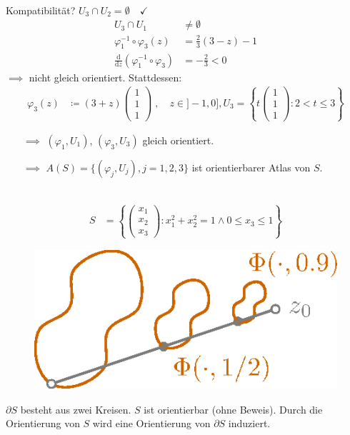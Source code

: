 \documentclass[a4paper,10pt]{scrbook}
\begin{document}
\begin{example}
\begin{enum-arab}
\begin{align*}
    \end{align*}
    Kompatibilität? $U_3 \cap U_2 = \emptyset \quad \checkmark$
    \begin{align*}
      U_3 \cap U_1 &\neq \emptyset \\
      \varphi_1^{-1} \circ \varphi_3(z) &= \frac{2}{3} (3-z) - 1 \\
      \frac{\mathrm{d}}{\mathrm{d}z} \left( \varphi_1^{-1} \circ \varphi_3 \right) &= -\frac{2}{3} < 0
    \end{align*}
    $\implies$ nicht gleich orientiert. Stattdessen:
    \begin{align*}
      \varphi_3(z) &\coloneq (3+z) \begin{pmatrix} 1 \\ 1 \\ 1 \end{pmatrix} \; , \quad z \in ]-1,0] , U_3 = \left\{ t \left(\begin{smallmatrix} 1 \\ 1 \\ 1 \end{smallmatrix}\right) : 2 < t \leq 3 \right\}
    \end{align*}
    \begin{itemize}
      \item[$\implies$] $(\varphi_1,U_1)$, $(\varphi_3,U_3)$ gleich orientiert.

      \item[$\implies$] $A(S) = \{ (\varphi_j,U_j), j=1,2,3 \}$ ist orientierbarer Atlas von $S$.
    \end{itemize}

    \item ~
    \begin{align*}
      S &= \left\{ \left(\begin{smallmatrix} x_1 \\ x_2 \\ x_3 \end{smallmatrix}\right) : x_1^2 + x_2^2 = 1 \land 0 \leq x_3 \leq 1 \right\}
    \end{align*}
    \begin{figure}[H]
      \centering
      \includegraphics[scale=0.2]{images/ana3-tmp-75}
    \end{figure}
    $\partial S$ besteht aus zwei Kreisen. $S$ ist orientierbar (ohne Beweis). Durch die Orientierung von $S$ wird eine Orientierung von $\partial S$ induziert.


\end{enum-arab}
\end{example}
\end{document}
